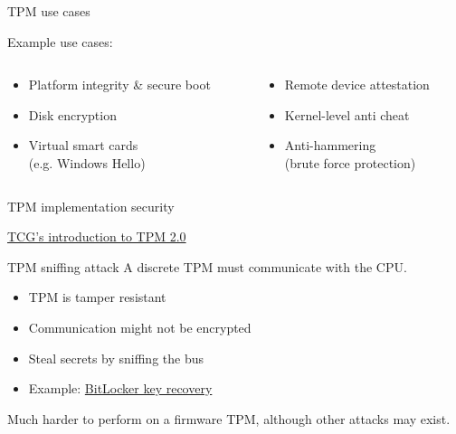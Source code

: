 \begin{frame}{TPM use cases}


  Example use cases:
  \begin{columns}[T,onlytextwidth]
    \begin{column}{0.5\textwidth}
      \begin{itemize}[<+(1)->]
        \item Platform integrity \& secure boot
        \item Disk encryption
        \item Virtual smart cards\\(e.g. Windows Hello)
      \end{itemize}
    \end{column}
    \begin{column}{0.5\textwidth}
      \begin{itemize}[<+(1)->]
        \item Remote device attestation
        \item Kernel-level anti cheat
        \item Anti-hammering\\(brute force protection)
      \end{itemize}
    \end{column}
  \end{columns}
\end{frame}

\begin{frame}{TPM implementation security}
  \begin{center}
    \href{https://trustedcomputinggroup.org/wp-content/uploads/TPM-2.0-A-Brief-Introduction.pdf}{TCG's introduction to TPM 2.0}
  \end{center}
\end{frame}

\begin{frame}{TPM sniffing attack}
  A discrete TPM must communicate with the CPU.
  \begin{itemize}[<+(1)->]
    \item TPM is tamper resistant
    \item Communication might not be encrypted
    \item Steal secrets by sniffing the bus
    \item Example: \href{https://pulsesecurity.co.nz/articles/TPM-sniffing}{BitLocker key recovery}
  \end{itemize}

  \vspace*{1em}

  \pause
  Much harder to perform on a firmware TPM, although other attacks may exist.
\end{frame}


